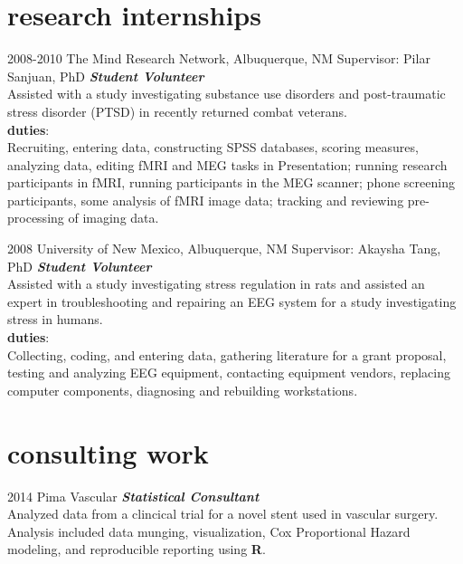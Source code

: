 \documentclass[]{friggeri-cv} %
\begin{document}
\section{research internships}
\begin{entrylist}
\entry
{\footnotesize{2008-2010}}
{The Mind Research Network, Albuquerque, NM \textemdash Supervisor: Pilar Sanjuan, PhD}
{}
{\emph{\textbf{Student Volunteer}} \\
Assisted with a study investigating substance use disorders and
post-traumatic stress disorder (PTSD) in recently returned combat veterans. \\
\textbf{duties}: \\
Recruiting, entering data, constructing SPSS databases, scoring
measures, analyzing data, editing fMRI and MEG tasks in Presentation; running research
participants in fMRI, running participants in the MEG scanner; phone screening participants,
some analysis of fMRI image data; tracking and reviewing pre-processing of imaging data.}
\end{entrylist}

\begin{entrylist}
\entry
{\footnotesize{2008}}
{University of New Mexico, Albuquerque, NM \textemdash Supervisor: Akaysha Tang, PhD}
{}
{\textbf{\emph{Student Volunteer}} \\
Assisted with a study investigating stress regulation in rats and assisted an
expert in troubleshooting and repairing an EEG system for a study investigating stress in
humans. \\
\textbf{duties}: \\
Collecting, coding, and entering data, gathering literature for a grant
proposal, testing and analyzing EEG equipment, contacting equipment vendors, replacing
computer components, diagnosing and rebuilding workstations.}
\end{entrylist}

\section{consulting work}
\begin{entrylist}
\entry
{\footnotesize{2014}}
{Pima Vascular}
{}
{\textbf{\emph{Statistical Consultant}} \\
Analyzed data from a clincical trial for a novel stent used in vascular surgery. 
Analysis included data munging, visualization, Cox Proportional Hazard modeling, 
and reproducible reporting using \textbf{R}.}
\end {entrylist}
\end{document}
